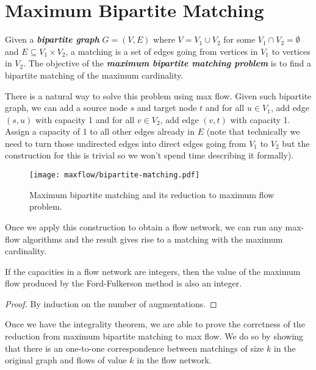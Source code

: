 \section{Maximum Bipartite Matching}  

Given a \textit{\textbf{bipartite graph}} $G=(V,E)$ where $V = V_1 \cup V_2$ for some $V_1 \cap V_2 = \emptyset$ and $E \subseteq V_1 \times V_2$, a matching is a set of edges going from vertices in $V_1$ to vertices in $V_2$. The objective of the \textit{\textbf{maximum bipartite matching problem}} is to find a bipartite matching of the maximum cardinality.

There is a natural way to solve this problem using max flow. Given such bipartite graph, we can add a source node $s$ and target node $t$ and for all $u \in V_1$, add edge $(s,u)$ with capacity 1 and for all $v \in V_2$, add edge $(v,t)$ with capacity 1. Assign a capacity of 1 to all other edges already in $E$ (note that technically we need to turn those undirected edges into direct edges going from $V_1$ to $V_2$ but the construction for this is trivial so we won't spend time describing it formally).

\begin{figure}[htbp]
    \centering
    \texttt{[image: maxflow/bipartite-matching.pdf]}
    \caption{Maximum bipartite matching and its reduction to maximum flow problem.}
    \label{fig:maximum-bipartite-matching}
\end{figure}

Once we apply this construction to obtain a flow network, we can run any max-flow algorithms and the result gives rise to a matching with the maximum cardinality.

\begin{theorem} 
    If the capacities in a flow network are integers, then the value of the maximum flow produced by the Ford-Fulkerson method is also an integer.
\end{theorem}

\begin{proof}
    By induction on the number of augmentations.
\end{proof}

Once we have the integrality theorem, we are able to prove the corrctness of the reduction from maximum bipartite matching to max flow. We do so by showing that there is an one-to-one correspondence between matchings of size $k$ in the original graph and flows of value $k$ in the flow network.

